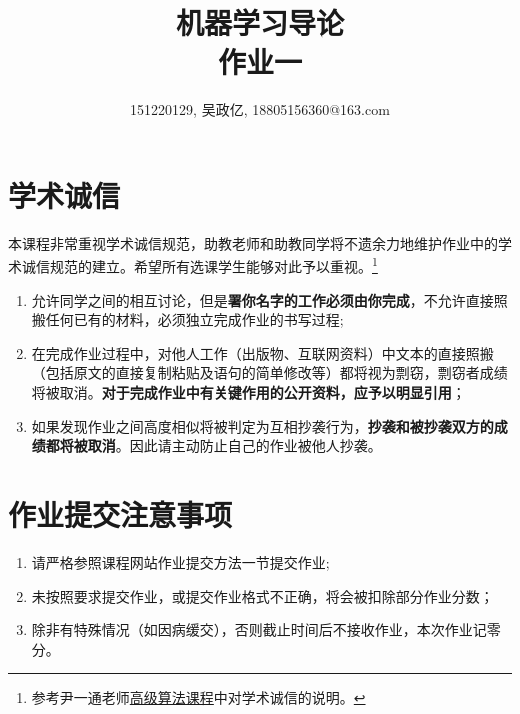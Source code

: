 \documentclass[a4paper,UTF8]{article}
\numberwithin{equation}{section}
\begin{document}
\title{机器学习导论\\
作业一}
\author{151220129, 吴政亿, 18805156360@163.com}
\maketitle

\section*{学术诚信}

本课程非常重视学术诚信规范，助教老师和助教同学将不遗余力地维护作业中的学术诚信规范的建立。希望所有选课学生能够对此予以重视。\footnote{参考尹一通老师\href{http://tcs.nju.edu.cn/wiki/}{高级算法课程}中对学术诚信的说明。}

\begin{tcolorbox}
\begin{enumerate}
  \item[(1)] 允许同学之间的相互讨论，但是{\color{red}\textbf{署你名字的工作必须由你完成}}，不允许直接照搬任何已有的材料，必须独立完成作业的书写过程;
  \item[(2)] 在完成作业过程中，对他人工作（出版物、互联网资料）中文本的直接照搬（包括原文的直接复制粘贴及语句的简单修改等）都将视为剽窃，剽窃者成绩将被取消。{\color{red}\textbf{对于完成作业中有关键作用的公开资料，应予以明显引用}}；
  \item[(3)] 如果发现作业之间高度相似将被判定为互相抄袭行为，{\color{red}\textbf{抄袭和被抄袭双方的成绩都将被取消}}。因此请主动防止自己的作业被他人抄袭。
\end{enumerate}
\end{tcolorbox}

\section*{作业提交注意事项}
\begin{tcolorbox}
\begin{enumerate}
  \item[(1)] 请严格参照课程网站作业提交方法一节提交作业;
  \item[(2)] 未按照要求提交作业，或提交作业格式不正确，将会被扣除部分作业分数；
  \item[(3)] 除非有特殊情况（如因病缓交），否则截止时间后不接收作业，本次作业记零分。
\end{enumerate}
\end{tcolorbox}

\newpage
\end{document}
